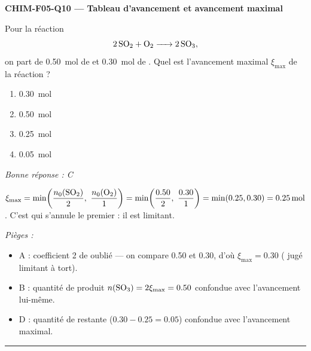 \documentclass[11pt,a4paper]{article}
\begin{document}
\noindent\textbf{CHIM-F05-Q10 --- Tableau d'avancement et avancement maximal}\par
Pour la réaction
\[\ce{2 SO2 + O2 -> 2 SO3},\]
on part de \qty{0.50}{\mole} de  et \qty{0.30}{\mole} de . Quel est l'avancement maximal $\xi_{\max}$ de la réaction ?
\begin{enumerate}[label=\Alph*)]
\item \qty{0.30}{\mole}
\item \qty{0.50}{\mole}
\item \qty{0.25}{\mole}
\item \qty{0.05}{\mole}
\end{enumerate}
\textit{Bonne réponse : C}\par
$\xi_{\max}=\min\!\left(\dfrac{n_0(\ce{SO2})}{2},\ \dfrac{n_0(\ce{O2})}{1}\right)=\min\!\left(\dfrac{\num{0.50}}{2},\ \dfrac{\num{0.30}}{1}\right)=\min(\num{0.25},\num{0.30})=\qty{0.25}{\mole}$. C'est  qui s'annule le premier : il est limitant.\par
\textit{Pièges :}
\begin{itemize}
\item A : coefficient \num{2} de  oublié — on compare \num{0.50} et \num{0.30}, d'où $\xi_{\max}=\num{0.30}$ ( jugé limitant à tort).
\item B : quantité de produit $n(\ce{SO3})=\num{2}\xi_{\max}=\num{0.50}$ confondue avec l'avancement lui-même.
\item D : quantité de  restante ($\num{0.30}-\num{0.25}=\num{0.05}$) confondue avec l'avancement maximal.
\end{itemize}
\vspace{6pt}\hrule
\end{document}
